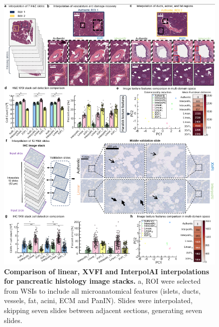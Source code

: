 \begin{refsection}
    \begin{figure}[p]
        \begin{center}
            \includegraphics[width=1\textwidth,height=0.85\textheight,keepaspectratio,clip,page=1]{figures/chapter6/fig_2.png}
            \captionsetup{font=small}
            \caption{\textbf{Comparison of linear, XVFI and InterpolAI interpolations for pancreatic histology image stacks.} a, ROI were selected from WSIs to include
            all microanatomical features (islets, ducts, vessels, fat, acini, ECM and PanIN).
            Slides were interpolated, skipping seven slides between adjacent sections,
            generating seven slides.}
            \label{chapter6_fig2}
        \end{center}
    \end{figure}
    

\end{refsection}
